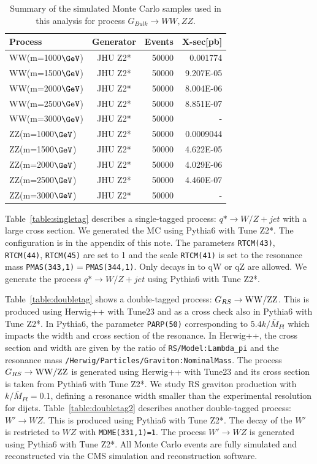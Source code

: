 \begin{table}[htb]
\begin{center}
\begin{tabular}{ |l|c|r|r| }
\hline
Process            & Generator             & Events & X-sec[pb] \\
\hline
WW(m=1000$\GeVcc$) &JHU Z2*   &50000  &0.001774 \\
WW(m=1500$\GeVcc$) &JHU Z2*   &50000  &9.207E-05 \\
WW(m=2000$\GeVcc$) &JHU Z2*   &50000  &8.004E-06 \\
WW(m=2500$\GeVcc$) &JHU Z2*   &50000  &8.851E-07 \\
WW(m=3000$\GeVcc$) &JHU Z2*   &50000  &- \\
ZZ(m=1000$\GeVcc$) &JHU Z2*   &50000  &0.0009044 \\
ZZ(m=1500$\GeVcc$) &JHU Z2*   &50000  &4.622E-05 \\
ZZ(m=2000$\GeVcc$) &JHU Z2*   &50000  &4.029E-06 \\
ZZ(m=2500$\GeVcc$) &JHU Z2*   &50000  &4.460E-07 \\
ZZ(m=3000$\GeVcc$) &JHU Z2*   &50000  &- \\
\hline
\end{tabular}
\end{center}
\caption{Summary of the simulated Monte Carlo samples used in this analysis for process
 $G_{Bulk} \to WW, ZZ$.}
\label{table:doubletagbulk}
\end{table}

Table~\ref{table:singletag} describes a single-tagged process: $q* \to W/Z + jet$
with a large cross section. We generated the MC using Pythia6 with Tune Z2*.
The configuration is in the appendix of this note.
The parameters \verb+RTCM(43)+, \verb+RTCM(44)+, \verb+RTCM(45)+ are set to 1 and the scale \verb+RTCM(41)+ is set to the resonance mass \verb+PMAS(343,1)+$=$\verb+PMAS(344,1)+. 
Only decays in to qW or qZ are allowed.
We generate the process $q* \to W/Z + jet$ using Pythia6 with Tune Z2*.

Table~\ref{table:doubletag} shows a double-tagged process: $G_{RS} \to {\mathrm{W}}{\mathrm{W}}/{\mathrm{Z}}{\mathrm{Z}}$.
This is produced using Herwig++ with Tune23 and as a cross check also in Pythia6 with Tune Z2*. 
In Pythia6, the parameter \verb+PARP(50)+ corresponding to $5.4 k/\bar{M}_{Pl}$ which impacts the width and 
cross section of the resonance.
In Herwig++, the cross section and width are given by the ratio of \verb+RS/Model:Lambda_pi+ and the resonance mass  \verb+/Herwig/Particles/Graviton:NominalMass+.
The process $G_{RS} \to {\mathrm{W}}{\mathrm{W}}/{\mathrm{Z}}{\mathrm{Z}}$ is generated using Herwig++ with Tune23 and its cross section is taken from Pythia6 with Tune Z2*.
We study RS graviton production with $k/\bar{M}_{Pl}=0.1$, defining a resonance width smaller than the experimental resolution for dijets.
Table~\ref{table:doubletag2} describes another double-tagged process:
$W' \to WZ$. This is produced using Pythia6 with Tune Z2*.
The decay of the $W'$ is restricted to $WZ$ with \verb+MDME(331,1)=1+.
The process $W' \to WZ$ is generated using Pythia6 with Tune Z2*.
All Monte Carlo events are fully simulated
and reconstructed via the CMS
simulation and reconstruction software. 
